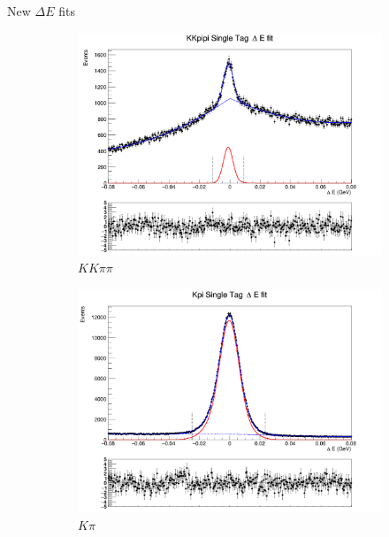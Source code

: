 \documentclass{beamer}
\begin{document}
\begin{frame}{New $\Delta E$ fits}
  \begin{figure}
    \centering
    \begin{subfigure}{0.38\textwidth}
      \centering
      \includegraphics[width=\textwidth]{Plots/KKpipi_SingleTag_DeltaE_Plot.png}
      \caption{$KK\pi\pi$}
    \end{subfigure}%
    \begin{subfigure}{0.38\textwidth}
      \centering
      \includegraphics[width=\textwidth]{Plots/Kpi_SingleTag_DeltaE_Plot.png}
      \caption{$K\pi$}
    \end{subfigure}
    \begin{subfigure}{0.38\textwidth}
      \centering

\end{subfigure}
\end{figure}
\end{frame}
\end{document}
